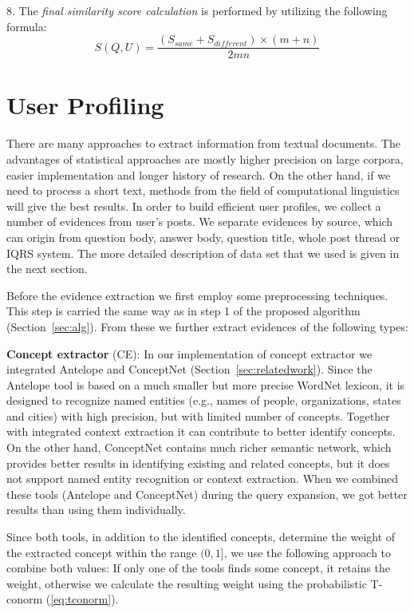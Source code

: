 \documentclass[conference]{IEEEtran}
\newcommand{\secref}[1]{Section~\ref{#1}}
\begin{document}
8. The {\it final similarity score calculation} is performed by utilizing the following formula:
\begin{equation}
	\label{eq:s}
	S(Q,U) = \frac{(S_{same}+S_{different})\times (m+n)}{2mn}
\end{equation}
	
\section{User Profiling}
\label{sec:userprofiling}
There are many approaches to extract information from textual documents. The advantages of statistical approaches are mostly higher precision on large corpora, easier implementation and longer history of research. On the other hand, if we need to process a short text, methods from the field of computational linguistics will give the best results. In order to build efficient user profiles, we collect a number of evidences from user's posts. We separate evidences by source, which can origin from question body, answer body, question title, whole post thread or IQRS system. The more detailed description of data set that we used is given in the next section.  

Before the evidence extraction we first employ some preprocessing techniques. This step is carried the same way as in step 1 of the proposed algorithm (\secref{sec:alg}). From these we further extract evidences of the following types:

{\bf Concept extractor} (CE):
In our implementation of concept extractor we integrated Antelope and ConceptNet (\secref{sec:relatedwork}). Since the Antelope tool is based on a much smaller but more precise WordNet lexicon, it is designed to recognize named entities (e.g., names of people, organizations, states and cities) with high precision, but with limited number of concepts. Together with integrated context extraction it can contribute to better identify concepts. On the other hand, ConceptNet contains much richer semantic network, which provides better results in identifying existing and related concepts, but it does not support named entity recognition or context extraction. When we combined these tools (Antelope and ConceptNet) during the query expansion, we got better results than using them individually.

Since both tools, in addition to the identified concepts, determine the weight of the extracted concept within the range $(0,1]$, we use the following approach to combine both values: If only one of the tools finds some concept, it retains the weight, otherwise we calculate the resulting weight using the probabilistic T-conorm (\ref{eq:tconorm}). 
\end{document}
